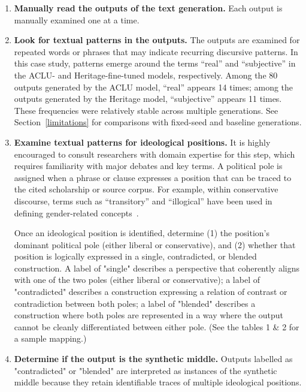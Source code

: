 \documentclass[anonymous,review]{acmart}
\begin{document}
\begin{enumerate}
\item \textbf{Manually read the outputs of the text generation.} Each output is manually examined one at a time. 

\item \textbf{Look for textual patterns in the outputs.} The outputs are examined for repeated words or phrases that may indicate recurring discursive patterns. In this case study, patterns emerge around the terms ``real'' and ``subjective'' in the ACLU- and Heritage-fine-tuned models, respectively. Among the 80 outputs generated by the ACLU model, ``real'' appears 14 times; among the outputs generated by the Heritage model, ``subjective'' appears 11 times. These frequencies were relatively stable across multiple generations. See Section~\ref{limitations} for comparisons with fixed-seed and baseline generations.

\item \textbf{Examine textual patterns for ideological positions.} It is highly encouraged to consult researchers with domain expertise for this step, which requires familiarity with major debates and key terms. A political pole is assigned when a phrase or clause expresses a position that can be traced to the cited scholarship or source corpus. For example, within conservative discourse, terms such as ``transitory'' and ``illogical'' have been used in defining gender-related concepts~\cite{heritage_2026;amin_2022}.

Once an ideological position is identified, determine (1) the position's dominant political pole (either liberal or conservative), and (2) whether that position is logically expressed in a single, contradicted, or blended construction. A label of "single" describes a perspective that coherently aligns with one of the two poles (either liberal or conservative); a label of "contradicted" describes a construction expressing a relation of contrast or contradiction between both poles; a label of "blended" describes a construction where both poles are represented in a way where the output cannot be cleanly differentiated between either pole. (See the tables 1 & 2 for a sample mapping.)

\item \textbf{Determine if the output is the synthetic middle.} Outputs labelled as "contradicted" or "blended" are interpreted as instances of the synthetic middle because they retain identifiable traces of multiple ideological positions.

\end{enumerate}
\end{document}
